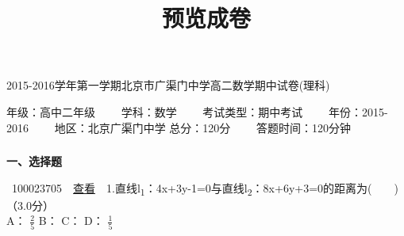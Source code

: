 \documentclass[]{article}
\title{预览成卷}
\date{}
\begin{document}
\maketitle

2015-2016学年第一学期北京市广渠门中学高二数学期中试卷(理科)

年级：高中二年级~~~~ 学科：数学~~~~ 考试类型：期中考试~~~~
年份：2015-2016~~~~ 地区：北京广渠门中学 总分：120分~~~~
答题时间：120分钟~~~~

\subsubsection{}\label{section}

\textbf{一、选择题}

~100023705~~\href{../question/viewQuestionDetail.jsp?questionID=100023705\&testPaperId=100229072}{查看}~~1.直线l\textsubscript{1}：4x+3y-1=0与直线l\textsubscript{2}：8x+6y+3=0的距离为(　　)\\
\hspace*{0.333em}\hspace*{0.333em}（3.0分）\\
\hspace*{0.333em}\hspace*{0.333em}\hspace*{0.333em}\hspace*{0.333em}\hspace*{0.333em}\hspace*{0.333em}\hspace*{0.333em}\hspace*{0.333em}A：
$\frac{2}{5}$
\hspace*{0.333em}\hspace*{0.333em}\hspace*{0.333em}\hspace*{0.333em}\hspace*{0.333em}\hspace*{0.333em}\hspace*{0.333em}\hspace*{0.333em}B：
\hspace*{0.333em}\hspace*{0.333em}\hspace*{0.333em}\hspace*{0.333em}\hspace*{0.333em}\hspace*{0.333em}\hspace*{0.333em}\hspace*{0.333em}C：‍
\hspace*{0.333em}\hspace*{0.333em}\hspace*{0.333em}\hspace*{0.333em}\hspace*{0.333em}\hspace*{0.333em}\hspace*{0.333em}\hspace*{0.333em}D：
$\frac{1}{5}$
\end{document}
